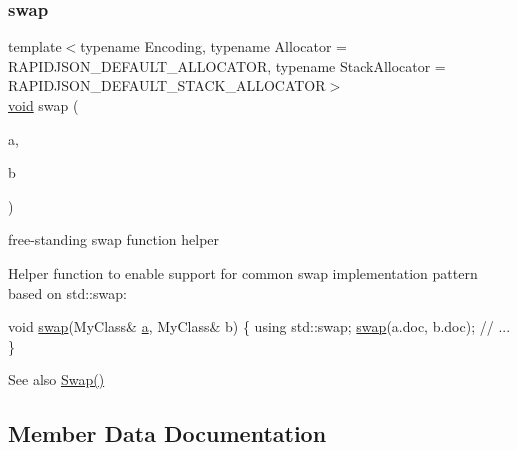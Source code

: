 \mbox{\label{classGenericDocument_a0d63efcc43758ac3aed77e868233369d}} 
\subsubsection{\texorpdfstring{swap}{swap}}
{\footnotesize\ttfamily template$<$typename Encoding, typename Allocator = R\+A\+P\+I\+D\+J\+S\+O\+N\+\_\+\+D\+E\+F\+A\+U\+L\+T\+\_\+\+A\+L\+L\+O\+C\+A\+T\+OR, typename Stack\+Allocator = R\+A\+P\+I\+D\+J\+S\+O\+N\+\_\+\+D\+E\+F\+A\+U\+L\+T\+\_\+\+S\+T\+A\+C\+K\+\_\+\+A\+L\+L\+O\+C\+A\+T\+OR$>$ \\
\hyperlink{imgui__impl__opengl3__loader_8h_ac668e7cffd9e2e9cfee428b9b2f34fa7}{void} swap (\begin{DoxyParamCaption}\item[{\hyperlink{classGenericDocument}{Generic\+Document}$<$ Encoding, Allocator, Stack\+Allocator $>$ \&}]{a,  }\item[{\hyperlink{classGenericDocument}{Generic\+Document}$<$ Encoding, Allocator, Stack\+Allocator $>$ \&}]{b }\end{DoxyParamCaption})\hspace{0.3cm}{\ttfamily [friend]}}



free-\/standing swap function helper 

Helper function to enable support for common swap implementation pattern based on {\ttfamily std\+::swap\+:} 
\begin{DoxyCode}
\textcolor{keywordtype}{void} \hyperlink{classGenericDocument_a0d63efcc43758ac3aed77e868233369d}{swap}(MyClass& \hyperlink{pointer_8h_aeeddce917cf130d62c370b8f216026dd}{a}, MyClass& b) \{
    \textcolor{keyword}{using} std::swap;
    \hyperlink{classGenericDocument_a0d63efcc43758ac3aed77e868233369d}{swap}(a.doc, b.doc);
    \textcolor{comment}{// ...}
\}
\end{DoxyCode}
 \begin{DoxySeeAlso}{See also}
\hyperlink{classGenericDocument_a6290e1290fad74177625af5938c0c58f}{Swap()} 
\end{DoxySeeAlso}


\subsection{Member Data Documentation}
\mbox{\label{classGenericDocument_a9b5f15fc75c8035612c37f796548e87a}} 
